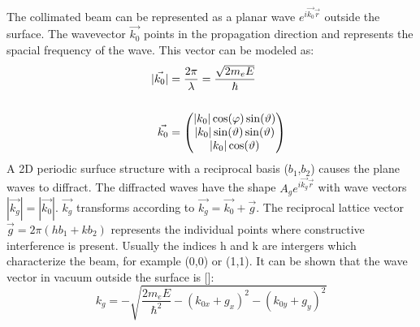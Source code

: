 \noindent The collimated beam can be represented as a planar wave $e^{i \vec{k_0} \vec{r}}$  outside the surface.
The wavevector $\vec{k_0}$ points in the propagation direction and represents the spacial frequency of the wave.
This vector can be modeled as:
\begin{align}
    |\vec{k_0}| &= \frac{2 \pi}{\lambda} = \frac{\sqrt{2 m_e E}}{\hbar} \\
    \hspace{1cm} \notag \\
    \vec{k_0} &= \begin{pmatrix}
        |k_0|\cos(\varphi)\sin(\vartheta)\\|k_0|\sin(\vartheta)\sin(\vartheta)\\|k_0| \cos(\vartheta)
    \end{pmatrix}
\end{align}
A 2D periodic surfuce structure with a reciprocal basis ($b_1$,$b_2$) causes the plane waves to diffract.
The diffracted waves have the shape $A_g e^{i \vec{k_g} \vec{r}}$ with wave vectors $|\vec{k_g}| = |\vec{k_0}|$.
$\vec{k_g}$ transforms according to $\vec{k_g} = \vec{k_0} + \vec{g}$. 
The reciprocal lattice vector $\vec{g} = 2 \pi ( h b_1 + k b_2)$ represents the individual points where constructive interference is present.
Usually the indices h and k are intergers which characterize the beam, for example (0,0) or (1,1).
It can be shown that the wave vector in vacuum outside the surface is [\cite{MoritzWolfgang2022SSDb}]:
\begin{equation}
    k_g = - \sqrt{\frac{2 m_e E}{\hbar^2} - (k_{0x}+ g_{x})^2 - (k_{0y}+ g_{y})^2}
\end{equation}


%        
%




\newpage